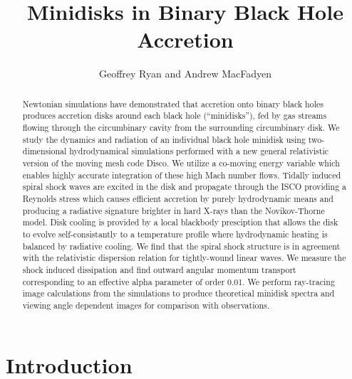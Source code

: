 \documentclass{emulateapj}
\begin{document}
\title{Minidisks in Binary Black Hole Accretion}
\author{Geoffrey Ryan and Andrew MacFadyen}

\begin{abstract}

  Newtonian simulations have demonstrated that accretion onto binary black holes produces accretion disks around each black hole (``minidisks''), fed by gas streams flowing through the circumbinary cavity from the surrounding circumbinary disk. We study the dynamics and radiation of an individual black hole minidisk using two-dimensional hydrodynamical simulations performed with a new general relativistic version of the moving mesh code Disco. We utilize a co-moving energy variable which enables highly accurate integration of these high Mach number flows. Tidally induced spiral shock waves are excited in the disk and propagate through the ISCO providing a Reynolds stress which causes efficient accretion by purely hydrodynamic means and producing a radiative signature brighter in hard X-rays than the Novikov-Thorne model. Disk cooling is provided by a local blackbody presciption that allows the disk to evolve self-consistantly to a temperature profile where hydrodynamic heating is balanced by radiative cooling. We find that the spiral shock structure is in agreement with the relativistic dispersion relation for tightly-wound linear waves. We measure the shock induced dissipation and find outward angular momentum transport corresponding to an effective alpha parameter of order 0.01. We perform ray-tracing image calculations from the simulations to produce theoretical minidisk spectra and viewing angle dependent images for comparison with observations.


\end{abstract}



\section{Introduction}
\label{sec:intro}
\end{document}
